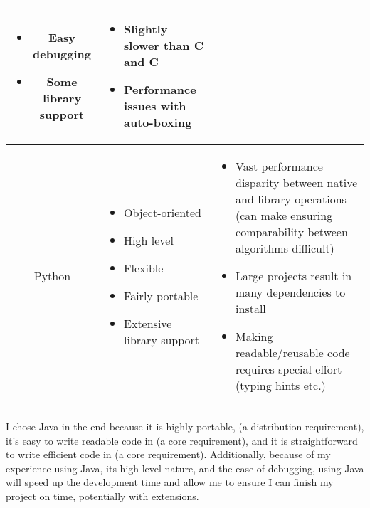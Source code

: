 \documentclass[12pt,a4paper,twoside,openright]{report}
\newcommand{\CC}{C\nolinebreak\hspace{-.05em}\raisebox{.4ex}{\tiny\bf +}\nolinebreak\hspace{-.10em}\raisebox{.4ex}{\tiny\bf +}} %
\begin{document}
\begin{table}[H]
\begin{tabularx}{\linewidth}{|c|X|X|}
\begin{itemize}[leftmargin=5mm]
				\item Easy debugging
				\item Some library support
			\end{itemize} &
			\begin{itemize}[leftmargin=5mm] \setlength\itemsep{-0.2em}
				\item Slightly slower than C and \CC
				\item Performance issues with auto-boxing
			\end{itemize} \\ 
			\hline 
			Python & \begin{itemize}[leftmargin=5mm] \setlength\itemsep{-0.2em}
				\item Object-oriented
				\item High level
				\item Flexible
				\item Fairly portable
				\item Extensive library support
			\end{itemize} &
			\begin{itemize}[leftmargin=5mm] \setlength\itemsep{-0.2em}
				\item Vast performance disparity between native and library operations (can make ensuring comparability between algorithms difficult)
				\item Large projects result in many dependencies to install
				\item Making readable/reusable code requires special effort (typing hints etc.)
			\end{itemize} \\ 
			\hline 
		\end{tabularx}
	\end{table}

	I chose Java in the end because it is highly portable, (a distribution requirement), it's easy to write readable code in (a core requirement), and it is straightforward to write efficient code in (a core requirement). Additionally, because of my experience using Java, its high level nature, and the ease of debugging, using Java will speed up the development time and allow me to ensure I can finish my project on time, potentially with extensions.
\end{document}
